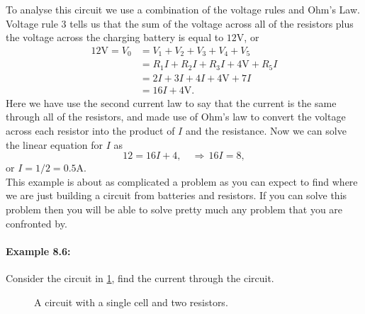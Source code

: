 \documentclass[a4paper,12pt]{book}
\begin{document}
To analyse this circuit we use a combination of the voltage rules and Ohm's Law.  Voltage rule 3 tells us that the sum of the voltage across all of the resistors plus the voltage across the charging battery is equal to $12\text{V}$, or
\begin{equation*}
\begin{split}
12\text{V}=V_{0}&=V_{1}+V_{2}+V_{3}+V_{4}+V_{5}\\
&=R_{1}I+R_{2}I+R_{3}I+4\text{V}+R_{5}I\\
&=2I+3I+4I+4\text{V}+7I\\
&=16I+4\text{V}.
\end{split}
\end{equation*}
Here we have use the second current law to say that the current is the same through all of the resistors, and made use of Ohm's law to convert the voltage across each resistor into the product of $I$ and the resistance. Now we can solve the linear equation for $I$ as
\begin{equation*}
12=16I+4, \quad \Rightarrow \, 16I=8,
\end{equation*}
or $I=1/2=0.5\text{A}$.\\

This example is about as complicated a problem as you can expect to find where we are just building a circuit from batteries and resistors. If you can solve this problem then you will be able to solve pretty much any problem that you are confronted by.

\paragraph{Example 8.6:} Consider the circuit in \cref{fig: 2 resistors}, find the current through the circuit.\\

  \begin{figure}[ht]
    \centering
    \caption{A circuit with a single cell and two resistors.}
    \label{fig: 2 resistors}
\end{figure}
\end{document}

